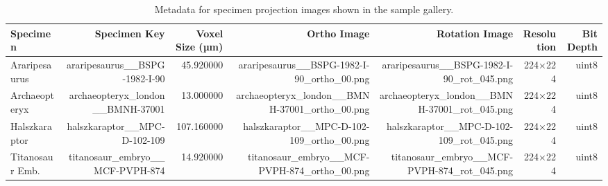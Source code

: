 \begin{table}[htbp]
\caption{Metadata for specimen projection images shown in the sample gallery.}
\label{tab:sample_projections}
\begin{tabular}{lrrrrrr}
\toprule
Specimen & Specimen Key & Voxel Size (µm) & Ortho Image & Rotation Image & Resolution & Bit Depth \\
\midrule
Araripesaurus & araripesaurus\_\_BSPG-1982-I-90 & 45.920000 & araripesaurus\_\_BSPG-1982-I-90\_ortho\_00.png & araripesaurus\_\_BSPG-1982-I-90\_rot\_045.png & 224×224 & uint8 \\
Archaeopteryx & archaeopteryx\_london\_\_BMNH-37001 & 13.000000 & archaeopteryx\_london\_\_BMNH-37001\_ortho\_00.png & archaeopteryx\_london\_\_BMNH-37001\_rot\_045.png & 224×224 & uint8 \\
Halszkaraptor & halszkaraptor\_\_MPC-D-102-109 & 107.160000 & halszkaraptor\_\_MPC-D-102-109\_ortho\_00.png & halszkaraptor\_\_MPC-D-102-109\_rot\_045.png & 224×224 & uint8 \\
Titanosaur Emb. & titanosaur\_embryo\_\_MCF-PVPH-874 & 14.920000 & titanosaur\_embryo\_\_MCF-PVPH-874\_ortho\_00.png & titanosaur\_embryo\_\_MCF-PVPH-874\_rot\_045.png & 224×224 & uint8 \\
\bottomrule
\end{tabular}
\end{table}
